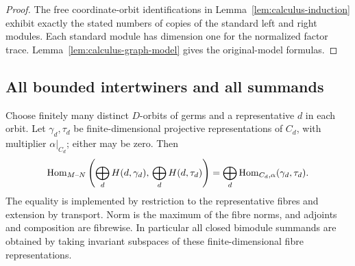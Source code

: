 \begin{proof}
The free coordinate-orbit identifications in
Lemma~\ref{lem:calculus-induction} exhibit exactly the stated numbers
of copies of the standard left and right modules.  Each standard
module has dimension one for the normalized factor trace.
Lemma~\ref{lem:calculus-graph-model} gives the original-model formulas.
\end{proof}

\subsection{All bounded intertwiners and all summands}

\begin{theorem}
\label{thm:calculus-hom}
Choose finitely many distinct $D$-orbits of germs and a representative
$d$ in each orbit.  Let $\gamma_d,\tau_d$ be finite-dimensional
projective representations of $C_d$, with multiplier $\alpha|_{C_d}$;
either may be zero.  Then
\begin{equation}\label{eq:calculus-hom}
 \operatorname{Hom}_{M\text{--}N}
 \left(\bigoplus_dH(d,\gamma_d),\,
       \bigoplus_dH(d,\tau_d)\right)
 =\bigoplus_d\operatorname{Hom}_{C_d,\alpha}(\gamma_d,\tau_d).
\end{equation}
The equality is implemented by restriction to the representative
fibres and extension by transport.  Norm is the maximum of the fibre
norms, and adjoints and composition are fibrewise.  In particular all
closed bimodule summands are obtained by taking invariant subspaces
of these finite-dimensional fibre representations.
\end{theorem}

